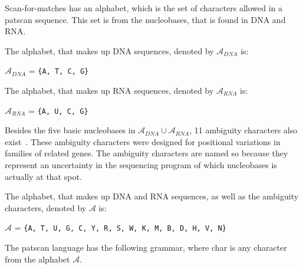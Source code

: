 \documentclass[12pt]{article}
\theoremstyle{definition}
\begin{document}
Scan-for-matches has an alphabet, which is the set of characters allowed in a patscan sequence. This set is from the nucleobases, that is found in DNA and RNA.
\begin{definition}
The alphabet, that makes up DNA sequences, denoted by $\mathcal{A}_{DNA}$ is:
\begin{center}
$\mathcal{A}_{DNA}$ = \texttt{\{A, T, C, G\}}
\end{center}
\end{definition}

\begin{definition}
The alphabet, that makes up RNA sequences, denoted by $\mathcal{A}_{RNA}$ is:
\begin{center}
$\mathcal{A}_{RNA}$ = \texttt{\{A, U, C, G\}}
\end{center}
\end{definition}

Besides the five basic nucleobases in $\mathcal{A}_{DNA} \cup \mathcal{A}_{RNA}$, 11 ambiguity characters also exist~\cite{DNA-sciencedaily}. These ambiguity characters were designed for positional variations in families of related genes. The ambiguity characters are named so because they represent an uncertainty in the sequencing program of which nucleobases is actually at that spot.

\begin{definition}
The alphabet, that makes up DNA and RNA sequences, as well as the ambiguity characters, denoted by $\mathcal{A}$ is:
\begin{center}
$\mathcal{A}$ = \texttt{\{A, T, U, G, C, Y, R, S, W, K, M, B, D, H, V, N\}}
\end{center}
\end{definition}

The patscan language has the following grammar, where char is any character from the alphabet $\mathcal{A}$.
\end{document}
